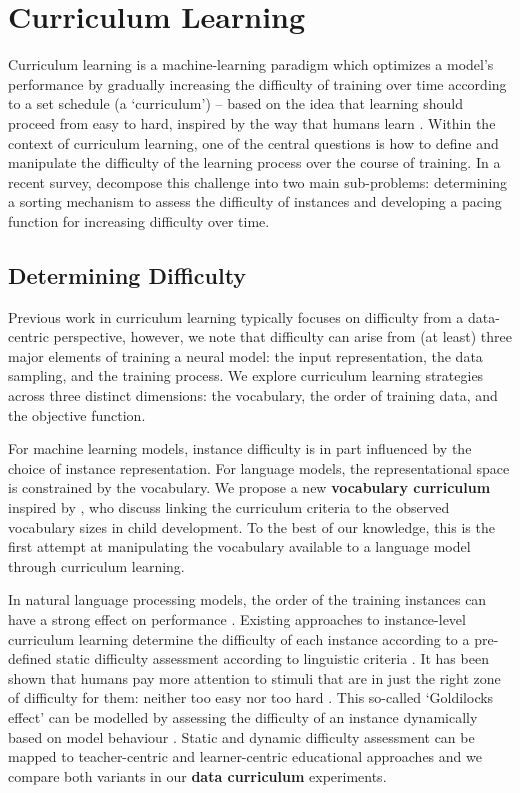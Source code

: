 \section{Curriculum Learning}
Curriculum learning \cite{bengio2009curriculum} is a machine-learning paradigm which optimizes a model's performance by gradually increasing the difficulty of training over time according to a set schedule (a `curriculum') -- based on the idea that learning should proceed from easy to hard, inspired by the way that humans learn \cite{elman1993learning}.
Within the context of curriculum learning, one of the central questions is how to define and manipulate the difficulty of the learning process over the course of training. In a recent survey, \citet{soviany2022curriculum} decompose this challenge into two main sub-problems: determining a sorting mechanism to assess the difficulty of instances and developing a pacing function for increasing difficulty over time. 

\subsection{Determining Difficulty}
Previous work in curriculum learning typically focuses on difficulty from a data-centric perspective, however, we note that difficulty can arise from (at least) three major elements of training a neural model: the input representation, the data sampling, and the training process. We explore curriculum learning strategies across three distinct dimensions: the vocabulary, the order of training data, and the objective function.

For machine learning models, instance difficulty is in part influenced by the choice of instance representation. For language models, the representational space is constrained by the vocabulary. We propose a new \textbf{vocabulary curriculum} inspired by \citet{soviany2022curriculum}, who discuss linking the curriculum criteria to the observed vocabulary sizes in child development. To the best of our knowledge, this is the first attempt at manipulating the vocabulary available to a language model through curriculum learning.

In natural language processing models, the order of the training instances can have a strong effect on performance \citep{schluter2018data}. 
Existing approaches to instance-level curriculum learning determine the difficulty of each instance according to a pre-defined static difficulty assessment according to linguistic criteria \citep{campos2021curriculum,kocmi2017curriculum,liu2018curriculum,platanios2019competence}.
It has been shown that humans pay more attention to stimuli that are in just the right zone of difficulty for them: neither too easy nor too hard \cite{kidd2012goldilocks}. This so-called `Goldilocks effect' can be modelled by assessing the difficulty of an instance dynamically based on model behaviour \citep{sachan2016easy,lalor2020dynamic}. Static and dynamic difficulty assessment can be mapped to teacher-centric and learner-centric educational approaches and we compare both variants in our \textbf{data curriculum} experiments. 

